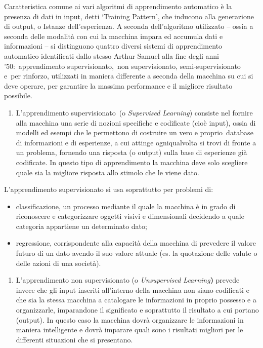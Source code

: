 {{Caratteristica comune ai vari algoritmi di apprendimento automatico è la
presenza di dati in input, detti `Training Pattern', che inducono alla
generazione di output, o Istanze dell'esperienza. A seconda
dell'algoritmo utilizzato -- ossia a seconda delle modalità con cui la
macchina impara ed accumula dati e informazioni -- si distinguono
quattro diversi sistemi di apprendimento automatico identificati dallo
stesso Arthur Samuel alla fine degli anni '50:~apprendimento
supervisionato,~non supervisionato, semi-supervisionato e~per rinforzo,
utilizzati in maniera differente a seconda della macchina su cui si deve
operare, per garantire la massima performance e il migliore risultato
possibile.

\begin{enumerate}
\def\labelenumi{\arabic{enumi}.}
\item
  L'apprendimento supervisionato~(o \emph{Supervised Learning}) consiste
  nel fornire alla macchina una serie di nozioni specifiche e codificate
  (cioè input), ossia di modelli ed esempi che le permettono di
  costruire un vero e proprio~database di informazioni e di esperienze,
  a cui attinge ogniqualvolta si trovi di fronte a un problema, fornendo
  una risposta (o output) sulla base di esperienze già codificate. In
  questo tipo di apprendimento la macchina deve solo scegliere quale sia
  la migliore risposta allo stimolo che le viene dato.
\end{enumerate}

L'apprendimento supervisionato si usa soprattutto per problemi di:

\begin{itemize}
\item
  classificazione, un processo mediante il quale la macchina è in grado
  di riconoscere e categorizzare oggetti visivi e dimensionali decidendo
  a quale categoria appartiene un determinato dato;
\item
  regressione, corrispondente alla capacità della macchina di prevedere
  il valore futuro di un dato avendo il suo valore attuale (es. la
  quotazione delle valute o delle azioni di una società).
\end{itemize}

\begin{enumerate}
\def\labelenumi{\arabic{enumi}.}
\setcounter{enumi}{1}
\item
  L'apprendimento non supervisionato (o \emph{Unsupervised
  Learning}\textbf{)} prevede invece che gli input inseriti all'interno
  della macchina non siano codificati e che sia la stessa macchina a
  catalogare le informazioni in proprio possesso e a organizzarle,
  imparandone il significato e soprattutto il risultato a cui portano
  (output). In questo caso la macchina dovrà organizzare le informazioni
  in maniera intelligente e dovrà imparare quali sono i risultati
  migliori per le differenti situazioni che si presentano.
\end{enumerate}

}}

